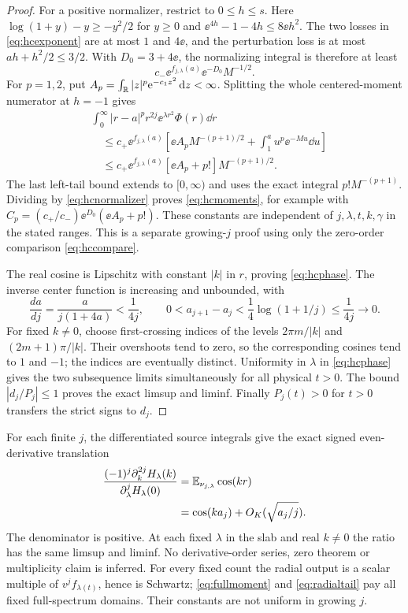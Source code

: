 \begin{proof}
For a positive normalizer, restrict to $0\le h\le s$.
Here $\log(1+y)-y\ge-y^2/2$ for $y\ge0$ and
$\ee^{4h}-1-4h\le8\ee h^2$. The two losses in
\eqref{eq:hcexponent} are at most $1$ and $4\ee$, and the perturbation
loss is at most $ah+h^2/2\le3/2$. With $D_0=3+4\ee$, the normalizing
integral is therefore at least
\begin{equation}\label{eq:hcnormalizer}
 c_-\ee^{f_{j,\lambda}(a)}\ee^{-D_0}M^{-1/2}.
\end{equation}
For $p=1,2$, put $A_p=\int_\mathbb R|z|^p\mathrm e^{-c_1z^2}\,\mathrm d z<\infty$.
Splitting the whole centered-moment numerator at $h=-1$ gives
\begin{align*}
 &\int_0^\infty |r-a|^p r^{2j}\ee^{\lambda r^2}\Phi(r)\dd r\\
 &\quad\le c_+\ee^{f_{j,\lambda}(a)}
 \left[\ee A_pM^{-(p+1)/2}+\int_1^a u^p\ee^{-Mu}\dd u\right]\\
 &\quad\le c_+\ee^{f_{j,\lambda}(a)}
 [\ee A_p+p!]M^{-(p+1)/2}.
\end{align*}
The last left-tail bound extends to $[0,\infty)$ and uses the exact
integral $p!M^{-(p+1)}$. Dividing by \eqref{eq:hcnormalizer} proves
\eqref{eq:hcmoments}, for example with
$C_p=(c_+/c_-)\ee^{D_0}(\ee A_p+p!)$. These constants are independent
of $j,\lambda,t,k,\gamma$ in the stated ranges. This is a separate
growing-$j$ proof using only the zero-order comparison
\eqref{eq:hccompare}.

The real cosine is Lipschitz with constant $|k|$ in $r$, proving
\eqref{eq:hcphase}. The inverse center function is increasing and
unbounded, with
\[
 \frac{da}{dj}=\frac{a}{j(1+4a)}<\frac1{4j},\qquad
 0<a_{j+1}-a_j<\frac14\log(1+1/j)\le\frac1{4j}\to0.
\]
For fixed $k\ne0$, choose first-crossing indices of the levels
$2\pi m/|k|$ and $(2m+1)\pi/|k|$. Their overshoots tend to zero,
so the corresponding cosines tend to $1$ and $-1$; the indices are
eventually distinct. Uniformity in $\lambda$ in \eqref{eq:hcphase}
gives the two subsequence limits simultaneously for all physical $t>0$.
The bound $|d_j/P_j|\le1$ proves the exact limsup and liminf.
Finally $P_j(t)>0$ for $t>0$ transfers the strict signs to $d_j$.
\end{proof}

For each finite $j$, the differentiated source integrals give the exact
signed even-derivative translation
\begin{equation}\label{eq:hcderivatives}
 \begin{aligned}
 \frac{(-1)^j\partial_k^{2j}H_\lambda(k)}
 {\partial_\lambda^jH_\lambda(0)}
 &=\mathbb E_{\nu_{j,\lambda}}\cos(kr)\\
 &=\cos(ka_j)+O_K(\sqrt{a_j/j}).
 \end{aligned}
\end{equation}
The denominator is positive. At each fixed $\lambda$ in the slab and
real $k\ne0$ the ratio has the same limsup and liminf. No derivative-order
series, zero theorem or multiplicity claim is inferred.
For every fixed count the radial output is a scalar multiple of
$v^jf_{\lambda(t)}$, hence is Schwartz; \eqref{eq:fullmoment} and
\eqref{eq:radialtail} pay all fixed full-spectrum domains. Their constants
are not uniform in growing $j$.

